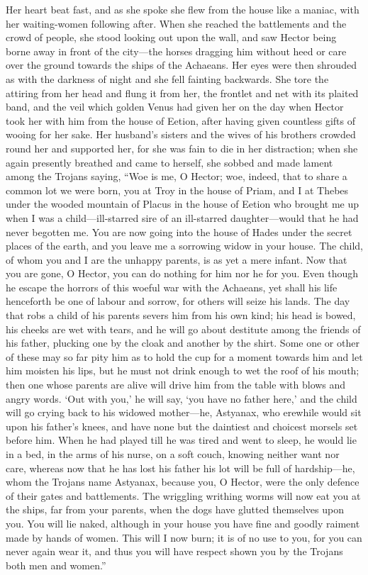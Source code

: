 Her heart beat fast, and as she spoke she flew from the house like a
maniac, with her waiting-women following after. When she reached the
battlements and the crowd of people, she stood looking out upon the wall,
and saw Hector being borne away in front of the city—the horses
dragging him without heed or care over the ground towards the ships of the
Achaeans. Her eyes were then shrouded as with the darkness of night and
she fell fainting backwards. She tore the attiring from her head and flung
it from her, the frontlet and net with its plaited band, and the veil
which golden Venus had given her on the day when Hector took her with him
from the house of Eetion, after having given countless gifts of wooing for
her sake. Her husband’s sisters and the wives of his brothers crowded
round her and supported her, for she was fain to die in her distraction;
when she again presently breathed and came to herself, she sobbed and made
lament among the Trojans saying, “Woe is me, O Hector; woe, indeed, that
to share a common lot we were born, you at Troy in the house of Priam, and
I at Thebes under the wooded mountain of Placus in the house of Eetion who
brought me up when I was a child—ill-starred sire of an ill-starred
daughter—would that he had never begotten me. You are now going into
the house of Hades under the secret places of the earth, and you leave me
a sorrowing widow in your house. The child, of whom you and I are the
unhappy parents, is as yet a mere infant. Now that you are gone, O Hector,
you can do nothing for him nor he for you. Even though he escape the
horrors of this woeful war with the Achaeans, yet shall his life
henceforth be one of labour and sorrow, for others will seize his lands.
The day that robs a child of his parents severs him from his own kind; his
head is bowed, his cheeks are wet with tears, and he will go about
destitute among the friends of his father, plucking one by the cloak and
another by the shirt. Some one or other of these may so far pity him as to
hold the cup for a moment towards him and let him moisten his lips, but he
must not drink enough to wet the roof of his mouth; then one whose parents
are alive will drive him from the table with blows and angry words. ‘Out
with you,’ he will say, ‘you have no father here,’ and the child will go
crying back to his widowed mother—he, Astyanax, who erewhile would
sit upon his father’s knees, and have none but the daintiest and choicest
morsels set before him. When he had played till he was tired and went to
sleep, he would lie in a bed, in the arms of his nurse, on a soft couch,
knowing neither want nor care, whereas now that he has lost his father his
lot will be full of hardship—he, whom the Trojans name Astyanax,
because you, O Hector, were the only defence of their gates and
battlements. The wriggling writhing worms will now eat you at the ships,
far from your parents, when the dogs have glutted themselves upon you. You
will lie naked, although in your house you have fine and goodly raiment
made by hands of women. This will I now burn; it is of no use to you, for
you can never again wear it, and thus you will have respect shown you by
the Trojans both men and women.”

